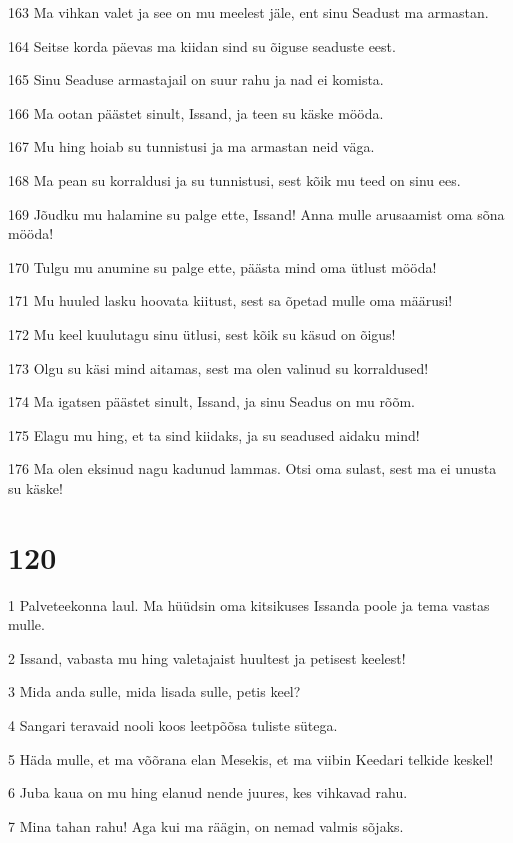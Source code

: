 \par 163 Ma vihkan valet ja see on mu meelest jäle, ent sinu Seadust ma armastan.
\par 164 Seitse korda päevas ma kiidan sind su õiguse seaduste eest.
\par 165 Sinu Seaduse armastajail on suur rahu ja nad ei komista.
\par 166 Ma ootan päästet sinult, Issand, ja teen su käske mööda.
\par 167 Mu hing hoiab su tunnistusi ja ma armastan neid väga.
\par 168 Ma pean su korraldusi ja su tunnistusi, sest kõik mu teed on sinu ees.
\par 169 Jõudku mu halamine su palge ette, Issand! Anna mulle arusaamist oma sõna mööda!
\par 170 Tulgu mu anumine su palge ette, päästa mind oma ütlust mööda!
\par 171 Mu huuled lasku hoovata kiitust, sest sa õpetad mulle oma määrusi!
\par 172 Mu keel kuulutagu sinu ütlusi, sest kõik su käsud on õigus!
\par 173 Olgu su käsi mind aitamas, sest ma olen valinud su korraldused!
\par 174 Ma igatsen päästet sinult, Issand, ja sinu Seadus on mu rõõm.
\par 175 Elagu mu hing, et ta sind kiidaks, ja su seadused aidaku mind!
\par 176 Ma olen eksinud nagu kadunud lammas. Otsi oma sulast, sest ma ei unusta su käske!

\chapter{120}

\par 1 Palveteekonna laul. Ma hüüdsin oma kitsikuses Issanda poole ja tema vastas mulle.
\par 2 Issand, vabasta mu hing valetajaist huultest ja petisest keelest!
\par 3 Mida anda sulle, mida lisada sulle, petis keel?
\par 4 Sangari teravaid nooli koos leetpõõsa tuliste sütega.
\par 5 Häda mulle, et ma võõrana elan Mesekis, et ma viibin Keedari telkide keskel!
\par 6 Juba kaua on mu hing elanud nende juures, kes vihkavad rahu.
\par 7 Mina tahan rahu! Aga kui ma räägin, on nemad valmis sõjaks.

